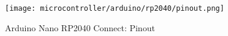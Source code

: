 \begin{frame}
    \begin{figure}
        \texttt{[image: microcontroller/arduino/rp2040/pinout.png]}
        \caption{Arduino\textregistered{} Nano RP2040 Connect: Pinout}
    \end{figure}
\end{frame}